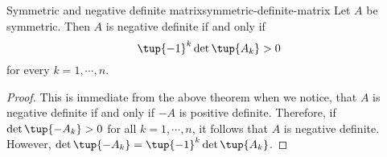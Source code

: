 \begin{corollary}{Symmetric and negative definite matrix}{symmetric-definite-matrix} %
Let $A$ be symmetric. Then $A$ is negative definite if and only
if 
\begin{equation*}
\tup{-1} ^{k} \det \tup{A_{k}} >0
\end{equation*}
for every $k=1,\cdots ,n$.
\end{corollary}

\begin{proof}This is immediate from the above theorem when we notice,
that $A$ is negative definite if and only if $-A$ is positive definite.
Therefore, if $\det \tup{-A_{k}} >0$ for all $k=1,\cdots ,n$, it
follows that $A$ is negative definite. However, $\det \tup{-A_{k}}
=\tup{-1} ^{k}\det \tup{A_{k}}$. 
\end{proof}